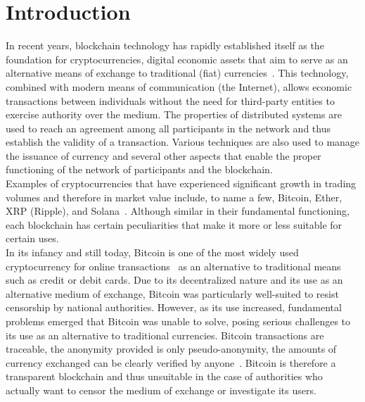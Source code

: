 \documentclass[conference]{IEEEtran}
\begin{document}
\section{Introduction}
In recent years, blockchain technology has rapidly established itself as the foundation for cryptocurrencies, digital economic assets that aim to serve as an alternative means of exchange to traditional (fiat) currencies~\cite{blockchain_adoption}. This technology, combined with modern means of communication (the Internet), allows economic transactions between individuals without the need for third-party entities to exercise authority over the medium. The properties of distributed systems are used to reach an agreement among all participants in the network and thus establish the validity of a transaction. Various techniques are also used to manage the issuance of currency and several other aspects that enable the proper functioning of the network of participants and the blockchain.\\
Examples of cryptocurrencies that have experienced significant growth in trading volumes and therefore in market value include, to name a few, Bitcoin, Ether, XRP (Ripple), and Solana~\cite{coin_market_cap}. Although similar in their fundamental functioning, each blockchain has certain peculiarities that make it more or less suitable for certain uses.\\

In its infancy and still today, Bitcoin is one of the most widely used cryptocurrency for online transactions~\cite{coin_market_cap} as an alternative to traditional means such as credit or debit cards. Due to its decentralized nature and its use as an alternative medium of exchange, Bitcoin was particularly well-suited to resist censorship by national authorities. However, as its use increased, fundamental problems emerged that Bitcoin was unable to solve, posing serious challenges to its use as an alternative to traditional currencies. Bitcoin transactions are traceable, the anonymity provided is only pseudo-anonymity, the amounts of currency exchanged can be clearly verified by anyone~\cite{bitcoin_auditable}. Bitcoin is therefore a transparent blockchain and thus unsuitable in the case of authorities who actually want to censor the medium of exchange or investigate its users.\\
\end{document}

